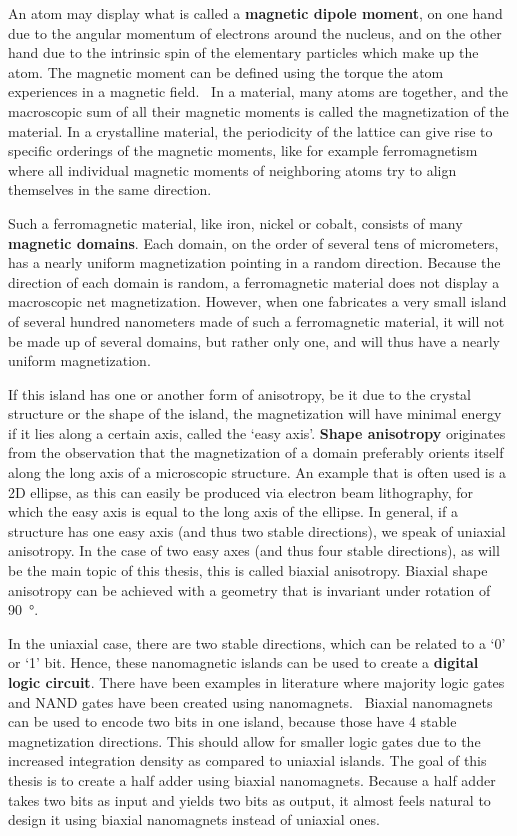 \documentclass[10pt,a4paper]{article}
\begin{document}
\noindent An atom may display what is called a \textbf{magnetic dipole moment}, on one hand due to the angular momentum of electrons around the nucleus, and on the other hand due to the intrinsic spin of the elementary particles which make up the atom. The magnetic moment can be defined using the torque the atom experiences in a magnetic field.~\cite{IntroMagneticMaterials} In a material, many atoms are together, and the macroscopic sum of all their magnetic moments is called the magnetization of the material. In a crystalline material, the periodicity of the lattice can give rise to specific orderings of the magnetic moments, like for example ferromagnetism where all individual magnetic moments of neighboring atoms try to align themselves in the same direction. \par 
Such a ferromagnetic material, like iron, nickel or cobalt, consists of many \textbf{magnetic domains}. Each domain, on the order of several tens of micrometers, has a nearly uniform magnetization pointing in a random direction. Because the direction of each domain is random, a ferromagnetic material does not display a macroscopic net magnetization. However, when one fabricates a very small island of several hundred nanometers made of such a ferromagnetic material, it will not be made up of several domains, but rather only one, and will thus have a nearly uniform magnetization. \par
If this island has one or another form of anisotropy, be it due to the crystal structure or the shape of the island, the magnetization will have minimal energy if it lies along a certain axis, called the `easy axis'. \textbf{Shape anisotropy} originates from the observation that the magnetization of a domain preferably orients itself along the long axis of a microscopic structure. An example that is often used is a 2D ellipse, as this can easily be produced via electron beam lithography, for which the easy axis is equal to the long axis of the ellipse. In general, if a structure has one easy axis (and thus two stable directions), we speak of uniaxial anisotropy. In the case of two easy axes (and thus four stable directions), as will be the main topic of this thesis, this is called biaxial anisotropy. Biaxial shape anisotropy can be achieved with a geometry that is invariant under rotation of \SI{90}{\degree}. \par
In the uniaxial case, there are two stable directions, which can be related to a `0' or `1' bit. Hence, these nanomagnetic islands can be used to create a \textbf{digital logic circuit}. There have been examples in literature where majority logic gates and NAND gates have been created using nanomagnets.~\cite{GYP-18} Biaxial nanomagnets can be used to encode two bits in one island, because those have 4 stable magnetization directions. This should allow for smaller logic gates due to the increased integration density as compared to uniaxial islands. The goal of this thesis is to create a half adder using biaxial nanomagnets. Because a half adder takes two bits as input and yields two bits as output, it almost feels natural to design it using biaxial nanomagnets instead of uniaxial ones.
\end{document}
